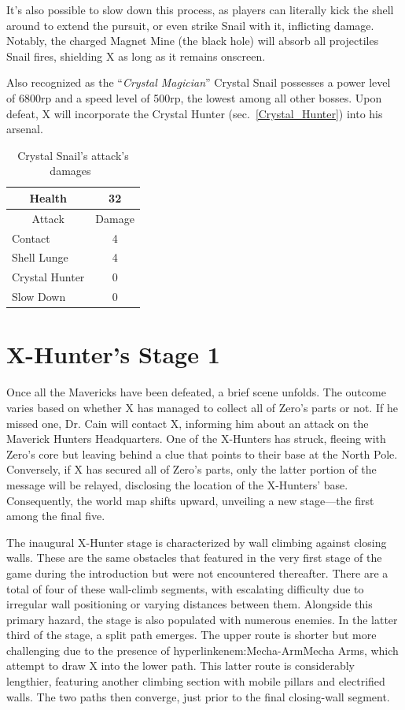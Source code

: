  It's also possible to slow down this process, as players can literally kick the shell around to extend the pursuit, or even strike Snail with it, inflicting damage. Notably, the charged Magnet Mine (the black hole) will absorb all projectiles Snail fires, shielding X as long as it remains onscreen.

Also recognized as the ``\textit{Crystal Magician}'' Crystal Snail possesses a power level of 6800rp and a speed level of 500rp, the lowest among all other bosses. Upon defeat, X will incorporate the Crystal Hunter (sec.~\ref{Crystal_Hunter}) into his arsenal.
\begin{table}[htp]
	\centering
	\begin{tabular}[h]{l c}
		\toprule
		\multicolumn{1}{c}{Health}  & 32 \\
		\midrule
		\multicolumn{1}{c}{Attack} & \multicolumn{1}{c}{Damage}\\
		Contact & 4 \\
		Shell Lunge & 4\\
		Crystal Hunter & 0\\
		Slow Down & 0\\
		\bottomrule
	\end{tabular}
	\caption{Crystal Snail's attack's damages~\cite{wiki:Crystal_snail}}
\end{table}

\section{X-Hunter's Stage 1}

Once all the Mavericks have been defeated, a brief scene unfolds. The outcome varies based on whether X has managed to collect all of Zero's parts or not. If he missed one, Dr. Cain will contact X, informing him about an attack on the Maverick Hunters Headquarters. One of the X-Hunters has struck, fleeing with Zero's core but leaving behind a clue that points to their base at the North Pole. Conversely, if X has secured all of Zero's parts, only the latter portion of the message will be relayed, disclosing the location of the X-Hunters' base. Consequently, the world map shifts upward, unveiling a new stage—the first among the final five.

The inaugural X-Hunter stage is characterized by wall climbing against closing walls. These are the same obstacles that featured in the very first stage of the game during the introduction but were not encountered thereafter. There are a total of four of these wall-climb segments, with escalating difficulty due to irregular wall positioning or varying distances between them. Alongside this primary hazard, the stage is also populated with numerous enemies. In the latter third of the stage, a split path emerges. The upper route is shorter but more challenging due to the presence of hyperlink{enem:Mecha-Arm}{Mecha Arms}, which attempt to draw X into the lower path. This latter route is considerably lengthier, featuring another climbing section with mobile pillars and electrified walls. The two paths then converge, just prior to the final closing-wall segment.

